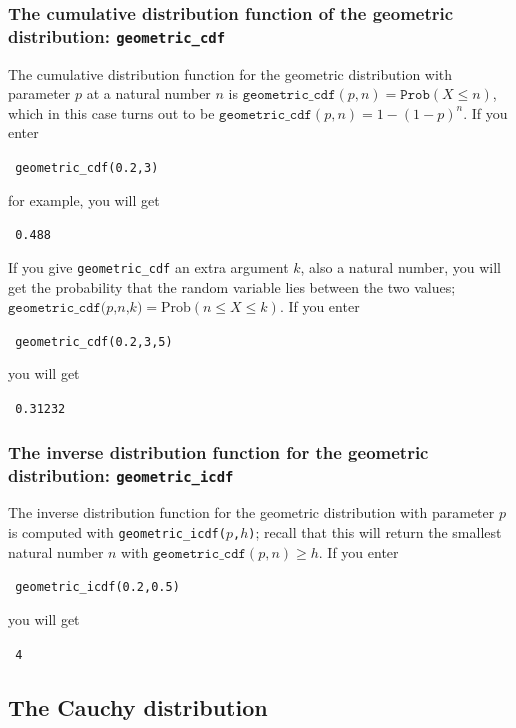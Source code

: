 \documentclass[a4paper,11pt]{book}
\begin{document}
\subsubsection{The cumulative distribution function of the geometric
distribution: \texttt{geometric\_cdf}}

The cumulative distribution function for the geometric distribution with
parameter $p$ at a natural number $n$ is
$\texttt{geometric\_cdf}(p,n) = \texttt{Prob}(X \le n)$, which in this
case turns out to be $\texttt{geometric\_cdf}(p,n) =
1 - (1-p)^n$.
If you enter
\begin{center}
  \tt
  geometric\_cdf(0.2,3)
\end{center}
for example, you will get
\begin{center}
  \tt
  0.488
\end{center}

If you give \texttt{geometric\_cdf} an extra argument $k$, also a
natural number, you will get the probability that
the random variable lies between the two values;
$\texttt{geometric\_cdf($p$,$n$,$k$)} = \text{Prob}(n \le X \le k)$.  
If you enter
\begin{center}
  \tt
  geometric\_cdf(0.2,3,5)
\end{center}
you will get
\begin{center}
  \tt
  0.31232
\end{center}

\subsubsection{The inverse distribution function for the
geometric distribution: \texttt{geometric\_icdf}}

The inverse distribution function for the geometric
distribution with parameter $p$ is computed with
\texttt{geometric\_icdf($p$,$h$)}; recall that this will return the
smallest natural number $n$ with $\texttt{geometric\_cdf}(p,n) \ge  h$.  If you enter
\begin{center}
  \tt
  geometric\_icdf(0.2,0.5)
\end{center}
you will get
\begin{center}
  \tt
  4
\end{center}

\subsection{The Cauchy distribution}
\end{document}
